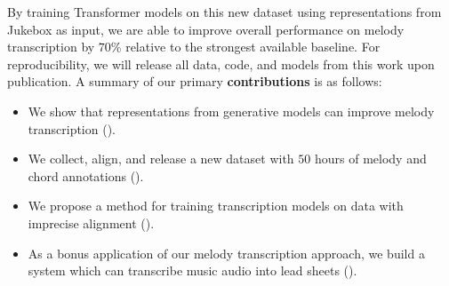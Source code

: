 By training Transformer models on this new dataset using representations from Jukebox as input, we are able to improve overall performance on melody transcription by 
$70$\% relative 
to the strongest available baseline. 
For reproducibility, we will release all data, code, and models from this work upon publication.
A summary of our primary \textbf{contributions} is as follows:
\begin{itemize}
    \item We show that representations from generative models can improve melody transcription ().
    \item We collect, align, and release a new dataset with $50$ hours of melody and chord annotations ().
    \item We propose a method for training transcription models on data with imprecise alignment ().
    \item As a bonus application of our melody transcription approach, we build a system which can transcribe music audio into lead sheets ().
\end{itemize}